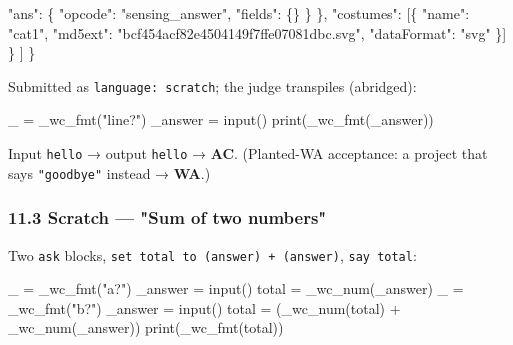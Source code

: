\documentclass[
]{article}
\newenvironment{Shaded}{}{}
\newcommand{\BuiltInTok}[1]{\textcolor[rgb]{0.00,0.50,0.00}{#1}}
\newcommand{\DataTypeTok}[1]{\textcolor[rgb]{0.56,0.13,0.00}{#1}}
\newcommand{\FunctionTok}[1]{\textcolor[rgb]{0.02,0.16,0.49}{#1}}
\newcommand{\NormalTok}[1]{#1}
\newcommand{\OperatorTok}[1]{\textcolor[rgb]{0.40,0.40,0.40}{#1}}
\newcommand{\OtherTok}[1]{\textcolor[rgb]{0.00,0.44,0.13}{#1}}
\newcommand{\StringTok}[1]{\textcolor[rgb]{0.25,0.44,0.63}{#1}}
\begin{document}
\begin{Shaded}
\begin{Highlighting}[]
        \DataTypeTok{"ans"}\FunctionTok{:}  \FunctionTok{\{} \DataTypeTok{"opcode"}\FunctionTok{:} \StringTok{"sensing\_answer"}\FunctionTok{,} \DataTypeTok{"fields"}\FunctionTok{:} \FunctionTok{\{\}} \FunctionTok{\}}
      \FunctionTok{\},}
      \DataTypeTok{"costumes"}\FunctionTok{:} \OtherTok{[}\FunctionTok{\{} \DataTypeTok{"name"}\FunctionTok{:} \StringTok{"cat1"}\FunctionTok{,} \DataTypeTok{"md5ext"}\FunctionTok{:} \StringTok{"bcf454acf82e4504149f7ffe07081dbc.svg"}\FunctionTok{,} \DataTypeTok{"dataFormat"}\FunctionTok{:} \StringTok{"svg"} \FunctionTok{\}}\OtherTok{]} \FunctionTok{\}}
  \OtherTok{]}
\FunctionTok{\}}
\end{Highlighting}
\end{Shaded}

Submitted as \texttt{language:\ scratch}; the judge transpiles
(abridged):

\begin{Shaded}
\begin{Highlighting}[]
\NormalTok{\_ }\OperatorTok{=}\NormalTok{ \_wc\_fmt(}\StringTok{"line?"}\NormalTok{)}
\NormalTok{\_answer }\OperatorTok{=} \BuiltInTok{input}\NormalTok{()}
\BuiltInTok{print}\NormalTok{(\_wc\_fmt(\_answer))}
\end{Highlighting}
\end{Shaded}

Input \texttt{hello} → output \texttt{hello} → \textbf{AC}. (Planted-WA
acceptance: a project that says \texttt{"goodbye"} instead →
\textbf{WA}.)

\subsubsection{11.3 Scratch --- "Sum of two
numbers"}\label{113-scratch--sum-of-two-numbers}

Two \texttt{ask} blocks, \texttt{set\ total\ to\ (answer)\ +\ (answer)},
\texttt{say\ total}:

\begin{Shaded}
\begin{Highlighting}[]
\NormalTok{\_ }\OperatorTok{=}\NormalTok{ \_wc\_fmt(}\StringTok{"a?"}\NormalTok{)}
\NormalTok{\_answer }\OperatorTok{=} \BuiltInTok{input}\NormalTok{()}
\NormalTok{total }\OperatorTok{=}\NormalTok{ \_wc\_num(\_answer)}
\NormalTok{\_ }\OperatorTok{=}\NormalTok{ \_wc\_fmt(}\StringTok{"b?"}\NormalTok{)}
\NormalTok{\_answer }\OperatorTok{=} \BuiltInTok{input}\NormalTok{()}
\NormalTok{total }\OperatorTok{=}\NormalTok{ (\_wc\_num(total) }\OperatorTok{+}\NormalTok{ \_wc\_num(\_answer))}
\BuiltInTok{print}\NormalTok{(\_wc\_fmt(total))}
\end{Highlighting}
\end{Shaded}
\end{document}

